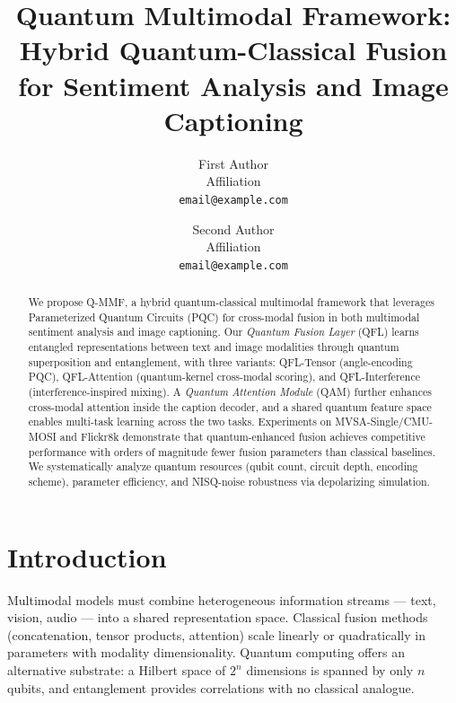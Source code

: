 \documentclass[11pt]{article}
\title{Quantum Multimodal Framework: Hybrid Quantum-Classical Fusion\\
       for Sentiment Analysis and Image Captioning}
\author{
  First Author \\
  Affiliation \\
  \texttt{email@example.com} \and
  Second Author \\
  Affiliation \\
  \texttt{email@example.com}
}
\begin{document}
\maketitle

\begin{abstract}
We propose Q-MMF, a hybrid quantum-classical multimodal framework that
leverages Parameterized Quantum Circuits (PQC) for cross-modal fusion in both
multimodal sentiment analysis and image captioning. Our \emph{Quantum Fusion
Layer} (QFL) learns entangled representations between text and image
modalities through quantum superposition and entanglement, with three variants:
QFL-Tensor (angle-encoding PQC), QFL-Attention (quantum-kernel cross-modal
scoring), and QFL-Interference (interference-inspired mixing). A \emph{Quantum
Attention Module} (QAM) further enhances cross-modal attention inside the
caption decoder, and a shared quantum feature space enables multi-task learning
across the two tasks. Experiments on MVSA-Single/CMU-MOSI and Flickr8k
demonstrate that quantum-enhanced fusion achieves competitive performance with
orders of magnitude fewer fusion parameters than classical baselines. We
systematically analyze quantum resources (qubit count, circuit depth, encoding
scheme), parameter efficiency, and NISQ-noise robustness via depolarizing
simulation.
\end{abstract}

\section{Introduction}

Multimodal models must combine heterogeneous information streams --- text,
vision, audio --- into a shared representation space. Classical fusion methods
(concatenation, tensor products, attention) scale linearly or quadratically in
parameters with modality dimensionality. Quantum computing offers an
alternative substrate: a Hilbert space of $2^n$ dimensions is spanned by only
$n$ qubits, and entanglement provides correlations with no classical analogue.
\end{document}
